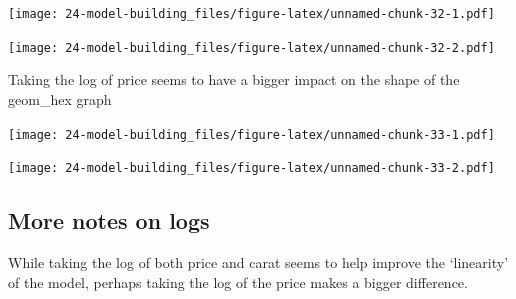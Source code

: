 \documentclass[]{book}
\newenvironment{Shaded}{\begin{snugshade}}{\end{snugshade}}
\newcommand{\DataTypeTok}[1]{\textcolor[rgb]{0.13,0.29,0.53}{#1}}
\newcommand{\FloatTok}[1]{\textcolor[rgb]{0.00,0.00,0.81}{#1}}
\newcommand{\KeywordTok}[1]{\textcolor[rgb]{0.13,0.29,0.53}{\textbf{#1}}}
\newcommand{\NormalTok}[1]{#1}
\newcommand{\OperatorTok}[1]{\textcolor[rgb]{0.81,0.36,0.00}{\textbf{#1}}}
\newcommand{\OtherTok}[1]{\textcolor[rgb]{0.56,0.35,0.01}{#1}}
\newcommand{\StringTok}[1]{\textcolor[rgb]{0.31,0.60,0.02}{#1}}
\theoremstyle{definition}
\theoremstyle{definition}
\theoremstyle{definition}
\theoremstyle{remark}
\begin{document}
\texttt{[image: 24-model-building\_files/figure-latex/unnamed-chunk-32-1.pdf]}

\begin{Shaded}
\end{Shaded}

\texttt{[image: 24-model-building\_files/figure-latex/unnamed-chunk-32-2.pdf]}

Taking the log of price seems to have a bigger impact on the shape of
the geom\_hex graph

\begin{Shaded}
\end{Shaded}

\texttt{[image: 24-model-building\_files/figure-latex/unnamed-chunk-33-1.pdf]}

\begin{Shaded}
\end{Shaded}

\texttt{[image: 24-model-building\_files/figure-latex/unnamed-chunk-33-2.pdf]}

\hypertarget{more-notes-on-logs}{%
\subsection{More notes on logs}\label{more-notes-on-logs}}

While taking the log of both price and carat seems to help improve the
`linearity' of the model, perhaps taking the log of the price makes a
bigger difference.
\end{document}

